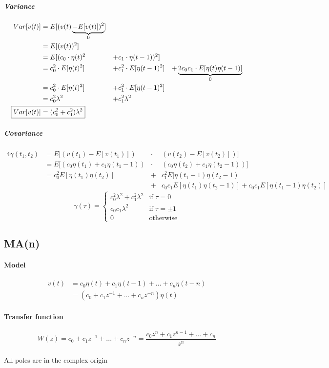 \documentclass{article}
\begin{document}
\subparagraph{Variance}
\begin{alignat*}{3}
	Var[v(t)]	&=	E[(v(t)	\underbrace{-E[v(t)])^2}_{0}]													\\
				&=	E[(v(t))^2]						\\
				&=	E[(c_0\cdot	\eta(t)^2		&+&	c_1\cdot	\eta(t-1))^2]	\\
				&=	c_0^2\cdot 	E[\eta(t)^2]		&+&	c_1^2\cdot E[\eta(t-1)^2]	&+	\underbrace{2 c_0 c_1 \cdot E[\eta(t)\eta(t-1)]}_0\\
				&=	c_0^2\cdot 	E[\eta(t)^2]		&+&	c_1^2\cdot E[\eta(t-1)^2]\\
				&=	c_0^2\lambda^2				&+&	c_1^2\lambda^2\\
	\Aboxed{Var[v(t)]&=(c_0^2+c_1^2)\lambda^2}
\end{alignat*}


\subparagraph{Covariance}
\begin{alignat*}{4}
	\gamma(t_1,t_2)	&=	E[(v(t_1)-E[v(t_1)])				&\cdot 	&		(v(t_2)-E[v(t_2)])]\\
					&=	E[(c_0\eta(t_1)+c_1\eta(t_1-1))	&\cdot 	&		(c_0\eta(t_2)+c_1\eta(t_2-1))]\\
					&=	c_0^2E[\eta(t_1)\eta(t_2)]		&+&				c_1^2E[\eta(t_1-1)\eta(t_2-1)\\
					&									&+&				c_0c_1E[\eta(t_1)\eta(t_2-1)]
						+c_0c_1E[\eta(t_1-1)\eta(t_2)]
\end{alignat*}
\[
\boxed{
	\gamma(\tau)=\begin{cases}
		c_0^2\lambda^2+c_1^2\lambda^2	&\text{if }\tau=0\\
		c_0c_1\lambda^2					&\text{if }\tau=\pm 1\\
		0								&\text{otherwise}
	\end{cases}
}
\]

\subsection{MA(n)}

\paragraph{Model}
\begin{align*}
v(t)&=c_0\eta(t)+c_1\eta(t-1)+...+c_n\eta(t-n)\\
&=(c_0+c_1z^{-1}+...+c_nz^{-n})\eta(t)
\end{align*}

\paragraph{Transfer function}
\[W(z)
=c_0+c_1z^{-1}+...+c_nz^{-n}
=\frac{c_0z^n+c_1z^{n-1}+...+c_n}{z^n}
\]\\
All poles are in the complex origin
\end{document}
